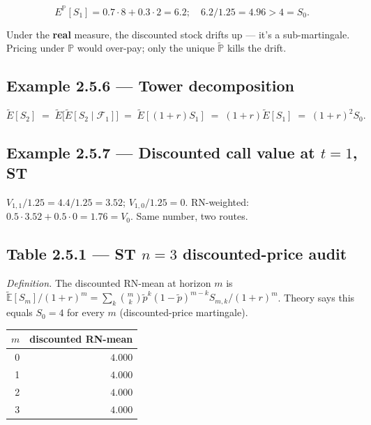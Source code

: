 \documentclass[
  10pt,
  twoside]{book}
\newcounter{none} %
\begin{document}
\[
E^{\mathbb P}[S_1] = 0.7\cdot 8 + 0.3\cdot 2 = 6.2;\quad 6.2/1.25 = 4.96 > 4 = S_0.
\]

Under the \textbf{real} measure, the discounted stock drifts up --- it's
a sub-martingale. Pricing under \(\mathbb P\) would over-pay; only the
unique \(\tilde{\mathbb P}\) kills the drift.

\subsection{Example 2.5.6 --- Tower
decomposition}\label{example-2.5.6-tower-decomposition}

\[
\tilde E[S_2] \;=\; \tilde E\bigl[\tilde E[S_2\mid\mathcal F_1]\bigr]
\;=\; \tilde E[(1+r)S_1]
\;=\; (1+r)\tilde E[S_1]
\;=\; (1+r)^2 S_0.
\]

\subsection{\texorpdfstring{Example 2.5.7 --- Discounted call value at
\(t=1\),
ST}{Example 2.5.7 --- Discounted call value at t=1, ST}}\label{example-2.5.7-discounted-call-value-at-t1-st}

\(V_{1,1}/1.25 = 4.4/1.25 = 3.52\); \(V_{1,0}/1.25 = 0\). RN-weighted:
\(0.5\cdot 3.52 + 0.5\cdot 0 = 1.76 = V_0\). Same number, two routes.

\subsection{\texorpdfstring{Table 2.5.1 --- ST \(n=3\) discounted-price
audit}{Table 2.5.1 --- ST n=3 discounted-price audit}}\label{table-2.5.1-st-n3-discounted-price-audit}

\emph{Definition.} The discounted RN-mean at horizon \(m\) is
\(\tilde{\mathbb E}[S_m]/(1+r)^m = \sum_k \binom{m}{k}\tilde p^k(1-\tilde p)^{m-k} S_{m,k}/(1+r)^m\).
Theory says this equals \(S_0 = 4\) for every \(m\) (discounted-price
martingale).

{\def\LTcaptype{none} %
\begin{table}[H]
\centering
\begin{tabular}{|r|r|}
\toprule
\(m\) & discounted RN-mean \\
\midrule



0 & \(4.000\) \\
1 & \(4.000\) \\
2 & \(4.000\) \\
3 & \(4.000\) \\
\bottomrule
\end{tabular}
\end{table}
}
\end{document}
